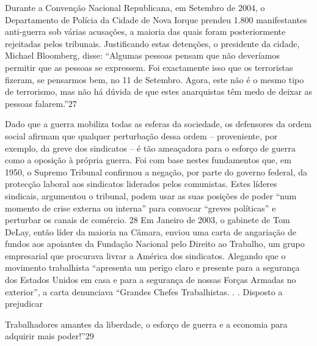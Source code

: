  \par 
Durante a Convenção Nacional Republicana, em Setembro de 2004, o Departamento de Polícia da Cidade de Nova Iorque prendeu {\color{blue}1}.{\color{blue}800} manifestantes anti-guerra sob várias acusações, a maioria das quais foram posteriormente rejeitadas pelos tribunais. Justificando estas detenções, o presidente da cidade, Michael Bloomberg, disse: “Algumas pessoas pensam que não deveríamos permitir que as pessoas se expressem. Foi exactamente isso que os terroristas fizeram, se pensarmos bem, no {\color{blue}11} de Setembro. Agora, este não é o mesmo tipo de terrorismo, mas não há dúvida de que estes anarquistas têm medo de deixar as pessoas falarem.”{\color{blue}27}
 \par 
Dado que a guerra mobiliza todas as esferas da sociedade, os defensores da ordem social afirmam que qualquer perturbação dessa ordem – proveniente, por exemplo, da greve dos sindicatos – é tão ameaçadora para o esforço de guerra como a oposição à própria guerra. Foi com base nestes fundamentos que, em 1950, o Supremo Tribunal confirmou a negação, por parte do governo federal, da protecção laboral aos sindicatos liderados pelos comunistas. Estes líderes sindicais, argumentou o tribunal, podem usar as suas posições de poder “num momento de crise externa ou interna” para convocar “greves políticas” e perturbar os canais de comércio. {\color{blue}28} Em Janeiro de 2003, o gabinete de Tom DeLay, então líder da maioria na Câmara, enviou uma carta de angariação de fundos aos apoiantes da Fundação Nacional pelo Direito ao Trabalho, um grupo empresarial que procurava livrar a América dos sindicatos. Alegando que o movimento trabalhista “apresenta um perigo claro e presente para a segurança dos Estados Unidos em casa e para a segurança de nossas Forças Armadas no exterior”, a carta denunciava “Grandes Chefes Trabalhistas. . . Disposto a prejudicar
 \par 
Trabalhadores amantes da liberdade, o esforço de guerra e a economia para adquirir mais poder!”{\color{blue}29}
 \par 
